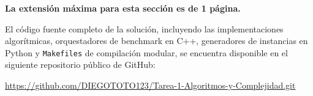 \begin{mdframed}
    \textbf{La extensión máxima para esta sección es de 1 página.}
\end{mdframed}

El código fuente completo de la solución, incluyendo las implementaciones algorítmicas, orquestadores de benchmark en C++, generadores de instancias en Python y \texttt{Makefiles} de compilación modular, se encuentra disponible en el siguiente repositorio público de GitHub:

\begin{center}
    \url{https://github.com/DIEGOTOTO123/Tarea-1-Algoritmos-y-Complejidad.git}
\end{center}
